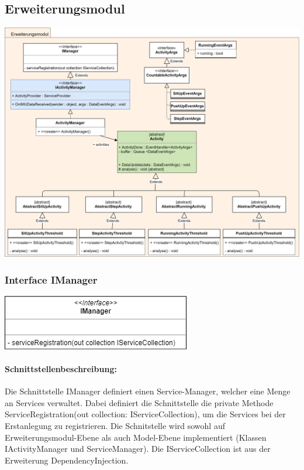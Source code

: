 \documentclass[a4paper,12pt]{article}
\begin{document}
\subsection{Erweiterungsmodul}
\begin{center}
	\centering
	\includegraphics[width=15cm]{bilder/ErweiterungsmodulTest.png}
\end{center}

\begin{minipage}[b]{0.5\textwidth}
	\subsubsection{Interface IManager}
	
	\end{minipage}
	\begin{minipage}[c]{0.5\textwidth}
	\includegraphics[width=\textwidth]{bilder/IManager.png}
\end{minipage}


	\paragraph{Schnittstellenbeschreibung:}
	Die Schnittstelle IManager definiert einen Service-Manager, welcher eine Menge an Services verwaltet. Dabei definiert die Schnittstelle die private Methode ServiceRegistration(out collection: IServiceCollection), um die Services bei der Erstanlegung zu registrieren. Die Schnitstelle wird sowohl auf Erweiterungsmodul-Ebene als auch Model-Ebene implementiert (Klassen IActivityManager und ServiceManager). Die IServiceCollection ist aus der Erweiterung \Gls{DependencyInjection}.
	
\end{document}
